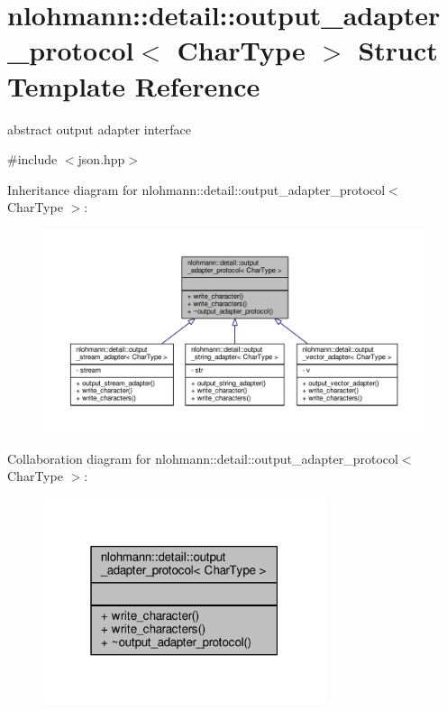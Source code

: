 \hypertarget{structnlohmann_1_1detail_1_1output__adapter__protocol}{}\section{nlohmann\+:\+:detail\+:\+:output\+\_\+adapter\+\_\+protocol$<$ Char\+Type $>$ Struct Template Reference}
\label{structnlohmann_1_1detail_1_1output__adapter__protocol}


abstract output adapter interface  




{\ttfamily \#include $<$json.\+hpp$>$}



Inheritance diagram for nlohmann\+:\+:detail\+:\+:output\+\_\+adapter\+\_\+protocol$<$ Char\+Type $>$\+:
\nopagebreak
\begin{figure}[H]
\begin{center}
\leavevmode
\includegraphics[width=350pt]{structnlohmann_1_1detail_1_1output__adapter__protocol__inherit__graph}
\end{center}
\end{figure}


Collaboration diagram for nlohmann\+:\+:detail\+:\+:output\+\_\+adapter\+\_\+protocol$<$ Char\+Type $>$\+:
\nopagebreak
\begin{figure}[H]
\begin{center}
\leavevmode
\includegraphics[width=235pt]{structnlohmann_1_1detail_1_1output__adapter__protocol__coll__graph}
\end{center}
\end{figure}
